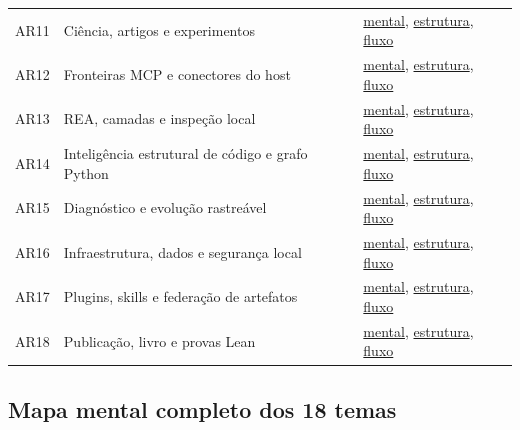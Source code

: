 {\begin{longtable}{p{1cm}p{7.2cm}p{5.5cm}}
AR11 & Ciência, artigos e experimentos & \hyperref[fig:AR11-mental]{mental}, \hyperref[fig:AR11-structure]{estrutura}, \hyperref[fig:AR11-flow]{fluxo} \\

AR12 & Fronteiras MCP e conectores do host & \hyperref[fig:AR12-mental]{mental}, \hyperref[fig:AR12-structure]{estrutura}, \hyperref[fig:AR12-flow]{fluxo} \\

AR13 & REA, camadas e inspeção local & \hyperref[fig:AR13-mental]{mental}, \hyperref[fig:AR13-structure]{estrutura}, \hyperref[fig:AR13-flow]{fluxo} \\

AR14 & Inteligência estrutural de código e grafo Python & \hyperref[fig:AR14-mental]{mental}, \hyperref[fig:AR14-structure]{estrutura}, \hyperref[fig:AR14-flow]{fluxo} \\

AR15 & Diagnóstico e evolução rastreável & \hyperref[fig:AR15-mental]{mental}, \hyperref[fig:AR15-structure]{estrutura}, \hyperref[fig:AR15-flow]{fluxo} \\

AR16 & Infraestrutura, dados e segurança local & \hyperref[fig:AR16-mental]{mental}, \hyperref[fig:AR16-structure]{estrutura}, \hyperref[fig:AR16-flow]{fluxo} \\

AR17 & Plugins, skills e federação de artefatos & \hyperref[fig:AR17-mental]{mental}, \hyperref[fig:AR17-structure]{estrutura}, \hyperref[fig:AR17-flow]{fluxo} \\

AR18 & Publicação, livro e provas Lean & \hyperref[fig:AR18-mental]{mental}, \hyperref[fig:AR18-structure]{estrutura}, \hyperref[fig:AR18-flow]{fluxo} \\

\bottomrule\end{longtable}}

\clearpage{}\label{fig:global-mental}

\subsection*{Mapa mental completo dos 18 temas}

